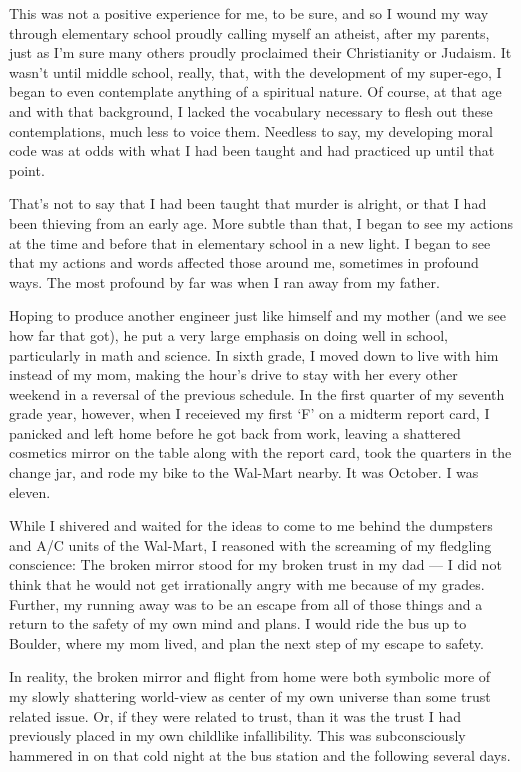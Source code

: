 This was not a positive experience for me, to be sure, and so I wound my way through elementary school proudly calling myself an atheist, after my parents, just as I'm sure many others proudly proclaimed their Christianity or Judaism. It wasn't until middle school, really, that, with the development of my super-ego, I began to even contemplate anything of a spiritual nature. Of course, at that age and with that background, I lacked the vocabulary necessary to flesh out these contemplations, much less to voice them. Needless to say, my developing moral code was at odds with what I had been taught and had practiced up until that point.

That's not to say that I had been taught that murder is alright, or that I had been thieving from an early age. More subtle than that, I began to see my actions at the time and before that in elementary school in a new light. I began to see that my actions and words affected those around me, sometimes in profound ways. The most profound by far was when I ran away from my father.

Hoping to produce another engineer just like himself and my mother (and we see how far that got), he put a very large emphasis on doing well in school, particularly in math and science. In sixth grade, I moved down to live with him instead of my mom, making the hour's drive to stay with her every other weekend in a reversal of the previous schedule. In the first quarter of my seventh grade year, however, when I receieved my first `F' on a midterm report card, I panicked and left home before he got back from work, leaving a shattered cosmetics mirror on the table along with the report card, took the quarters in the change jar, and rode my bike to the Wal-Mart nearby. It was October. I was eleven.

While I shivered and waited for the ideas to come to me behind the dumpsters and A/C units of the Wal-Mart, I reasoned with the screaming of my fledgling conscience: The broken mirror stood for my broken trust in my dad --- I did not think that he would not get irrationally angry with me because of my grades. Further, my running away was to be an escape from all of those things and a return to the safety of my own mind and plans. I would ride the bus up to Boulder, where my mom lived, and plan the next step of my escape to safety.

In reality, the broken mirror and flight from home were both symbolic more of my slowly shattering world-view as center of my own universe than some trust related issue. Or, if they were related to trust, than it was the trust I had previously placed in my own childlike infallibility. This was subconsciously hammered in on that cold night at the bus station and the following several days.

